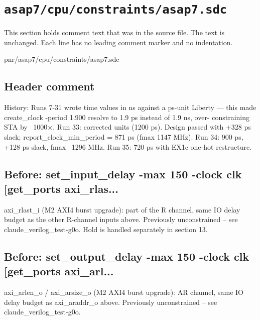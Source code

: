 \section{\texttt{asap7/cpu/constraints/asap7.sdc}}\label{tm:pd:asap7-cpu-sdc}

This section holds comment text that was in the source file. The text is unchanged. Each line has no leading comment marker and no indentation.

\begin{relocated}{pnr/asap7/cpu/constraints/asap7.sdc}

\subsection*{Header comment}

\begin{textblock}
History:
  Runs 7-31 wrote time values in ns against a ps-unit Liberty — this made
  create_clock -period 1.900 resolve to 1.9 ps instead of 1.9 ns, over-
  constraining STA by ~1000×.
  Run 33: corrected units (1200 ps). Design passed with +328 ps slack;
  report_clock_min_period = 871 ps (fmax 1147 MHz). Run 34: 900 ps, +128 ps
  slack, fmax ~1296 MHz. Run 35: 720 ps with EX1c one-hot restructure.

\end{textblock}

\subsection*{Before: set\_input\_delay  -max 150 -clock clk [get\_ports axi\_rlas...}

\begin{textblock}
axi_rlast_i (M2 AXI4 burst upgrade): part of the R channel, same IO delay
budget as the other R-channel inputs above. Previously unconstrained --
see claude_verilog_test-g0o. Hold is handled separately in section 13.
\end{textblock}

\subsection*{Before: set\_output\_delay -max  150 -clock clk [get\_ports axi\_arl...}

\begin{textblock}
axi_arlen_o / axi_arsize_o (M2 AXI4 burst upgrade): AR channel, same IO
delay budget as axi_araddr_o above. Previously unconstrained -- see
claude_verilog_test-g0o.
\end{textblock}


\end{relocated}
